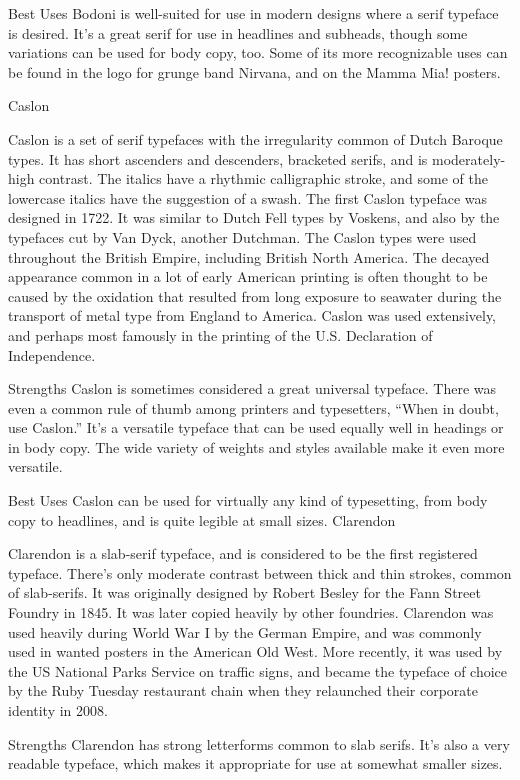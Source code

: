 \documentclass[12pt,a4paper,twocolumn]{book} %
\begin{document}
Best Uses
Bodoni is well-suited for use in modern designs where a serif typeface is desired. It’s a great serif for use in headlines and subheads, though some variations can be used for body copy, too. Some of its more recognizable uses can be found in the logo for grunge band Nirvana, and on the Mamma Mia! posters.


Caslon

Caslon is a set of serif typefaces with the irregularity common of Dutch Baroque types. It has short ascenders and descenders, bracketed serifs, and is moderately-high contrast. The italics have a rhythmic calligraphic stroke, and some of the lowercase italics have the suggestion of a swash.
The first Caslon typeface was designed in 1722. It was similar to Dutch Fell types by Voskens, and also by the typefaces cut by Van Dyck, another Dutchman. The Caslon types were used throughout the British Empire, including British North America. The decayed appearance common in a lot of early American printing is often thought to be caused by the oxidation that resulted from long exposure to seawater during the transport of metal type from England to America. Caslon was used extensively, and perhaps most famously in the printing of the U.S. Declaration of Independence.

Strengths
Caslon is sometimes considered a great universal typeface. There was even a common rule of thumb among printers and typesetters, “When in doubt, use Caslon.” It’s a versatile typeface that can be used equally well in headings or in body copy. The wide variety of weights and styles available make it even more versatile.

Best Uses
Caslon can be used for virtually any kind of typesetting, from body copy to headlines, and is quite legible at small sizes.
Clarendon

Clarendon is a slab-serif typeface, and is considered to be the first registered typeface. There’s only moderate contrast between thick and thin strokes, common of slab-serifs. It was originally designed by Robert Besley for the Fann Street Foundry in 1845. It was later copied heavily by other foundries.
Clarendon was used heavily during World War I by the German Empire, and was commonly used in wanted posters in the American Old West. More recently, it was used by the US National Parks Service on traffic signs, and became the typeface of choice by the Ruby Tuesday restaurant chain when they relaunched their corporate identity in 2008.

Strengths
Clarendon has strong letterforms common to slab serifs. It’s also a very readable typeface, which makes it appropriate for use at somewhat smaller sizes.
\end{document}
